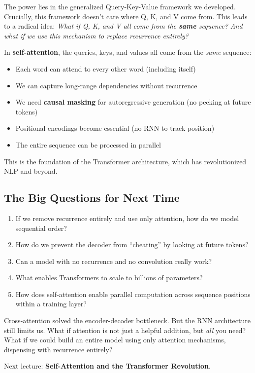 \documentclass{article}
\begin{document}
The power lies in the generalized Query-Key-Value framework we developed. Crucially, this framework doesn't care where Q, K, and V come from. This leads to a radical idea: \textit{What if Q, K, and V all come from the \textbf{same} sequence? And what if we use this mechanism to replace recurrence entirely?}

\begin{tcolorbox}[colback=blue!5!white, colframe=blue!75!black, title=Preview: Self-Attention]
In \textbf{self-attention}, the queries, keys, and values all come from the \textit{same} sequence:

\begin{itemize}
    \item Each word can attend to every other word (including itself)
    \item We can capture long-range dependencies without recurrence
    \item We need \textbf{causal masking} for autoregressive generation (no peeking at future tokens)
    \item Positional encodings become essential (no RNN to track position)
    \item The entire sequence can be processed in parallel
\end{itemize}

This is the foundation of the Transformer architecture, which has revolutionized NLP and beyond.
\end{tcolorbox}

\subsection{The Big Questions for Next Time}

\begin{enumerate}
    \item If we remove recurrence entirely and use only attention, how do we model sequential order?
    \item How do we prevent the decoder from ``cheating'' by looking at future tokens?
    \item Can a model with no recurrence and no convolution really work?
    \item What enables Transformers to scale to billions of parameters?
    \item How does self-attention enable parallel computation across sequence positions within a training layer?
\end{enumerate}

\begin{tcolorbox}[colback=green!5!white, colframe=green!50!black, title=The Cliffhanger]
Cross-attention solved the encoder-decoder bottleneck. But the RNN architecture still limits us. What if attention is not just a helpful addition, but \textit{all} you need? What if we could build an entire model using only attention mechanisms, dispensing with recurrence entirely?

Next lecture: \textbf{Self-Attention and the Transformer Revolution}.
\end{tcolorbox}
\end{document}
